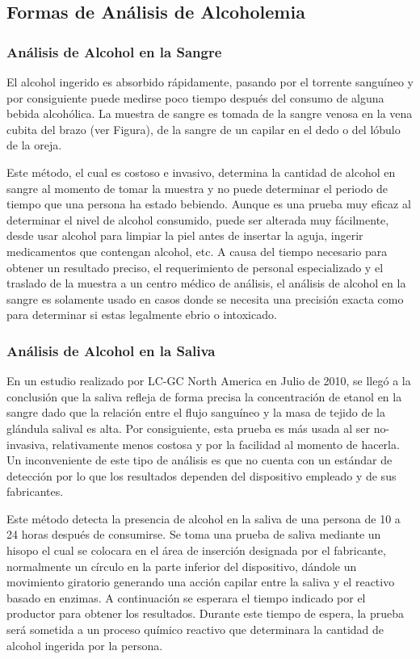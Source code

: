 \subsection{Formas de Análisis de Alcoholemia}
\subsubsection{Análisis de Alcohol en la Sangre}
El alcohol ingerido es absorbido rápidamente, pasando por el torrente sanguíneo y por consiguiente puede medirse poco tiempo después del consumo de alguna bebida alcohólica. La muestra de sangre es tomada de la sangre venosa en la vena cubita del brazo (ver Figura), de la sangre de un capilar en el dedo o del lóbulo de la oreja. \par
Este método, el cual es costoso e invasivo, determina la cantidad de alcohol en sangre al momento de tomar la muestra y no puede determinar el periodo de tiempo que una persona ha estado bebiendo. Aunque es una prueba muy eficaz al determinar el nivel de alcohol consumido, puede ser alterada muy fácilmente, desde usar alcohol para limpiar la piel antes de insertar la aguja, ingerir medicamentos que contengan alcohol, etc. A causa del tiempo necesario para obtener un resultado preciso, el requerimiento de personal especializado y el traslado de la muestra a un centro médico de análisis, el análisis de alcohol en la sangre es solamente usado en casos donde se necesita una precisión exacta como para determinar si estas legalmente ebrio o intoxicado. 
\subsubsection{Análisis de Alcohol en la Saliva}
En un estudio realizado por LC-GC North America en Julio de 2010, se llegó a la conclusión que la saliva refleja de forma precisa la concentración de etanol en la sangre dado que la relación entre el flujo sanguíneo y la masa de tejido de la glándula salival es alta. Por consiguiente, esta prueba es más usada al ser no-invasiva, relativamente menos costosa y por la facilidad al momento de hacerla. Un inconveniente de este tipo de análisis es que no cuenta con un estándar de detección por lo que los resultados dependen del dispositivo empleado y de sus fabricantes. \par
Este método detecta la presencia de alcohol en la saliva de una persona de 10 a 24 horas después de consumirse. Se toma una prueba de saliva mediante un hisopo el cual se colocara en el área de inserción designada por el fabricante, normalmente un círculo en la parte inferior del dispositivo, dándole un movimiento giratorio generando una acción capilar entre la saliva y el reactivo basado en enzimas. A continuación se esperara el tiempo indicado por el productor para obtener los resultados. Durante este tiempo de espera, la prueba será sometida a un proceso químico reactivo que determinara la cantidad de alcohol ingerida por la persona.
